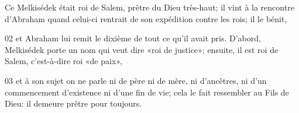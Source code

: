 Ce Melkisédek était roi de Salem, prêtre du Dieu très-haut; il vint à la rencontre d’Abraham quand celui-ci rentrait de son expédition contre les rois; il le bénit,

02 et Abraham lui remit le dixième de tout ce qu’il avait pris. D’abord, Melkisédek porte un nom qui veut dire «roi de justice»; ensuite, il est roi de Salem, c’est-à-dire roi «de paix»,

03 et à son sujet on ne parle ni de père ni de mère, ni d’ancêtres, ni d’un commencement d’existence ni d’une fin de vie; cela le fait ressembler au Fils de Dieu: il demeure prêtre pour toujours.
